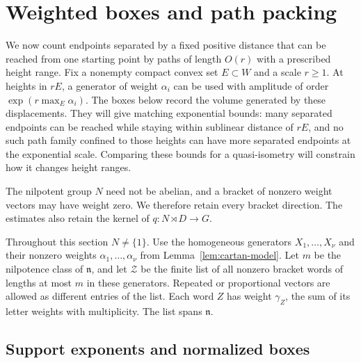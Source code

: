 \section{Weighted boxes and path packing}\label{sec:boxes}

We now count endpoints separated by a fixed positive distance that can
be reached from one starting point by paths of length $O(r)$ with a
prescribed height range. Fix a nonempty compact convex set $E\subset W$
and a scale $r\ge1$.
At heights in $rE$, a generator of weight $\alpha_i$ can
be used with amplitude of order $\exp(r\max_E\alpha_i)$. The boxes below
record the volume generated by these displacements. They will give
matching exponential bounds: many separated endpoints can be reached
while staying within sublinear distance of $rE$, and no such path family
confined to those heights can have more separated endpoints at
the exponential scale. Comparing these bounds for a quasi-isometry
will constrain how it changes height ranges.

The nilpotent group $N$ need not be abelian, and a bracket of nonzero
weight vectors may have weight zero. We therefore retain every bracket
direction. The estimates also retain the kernel of
$q:N\rtimes D\to G$.

Throughout this section $N\ne\{1\}$. Use the homogeneous generators
$X_1,\ldots,X_\nu$ and their nonzero weights $\alpha_1,\ldots,\alpha_\nu$
from Lemma~\ref{lem:cartan-model}. Let $m$ be the nilpotence class of
$\mathfrak n$, and let $\mathcal Z$ be the finite list of all nonzero
bracket words of lengths at most $m$ in these generators. Repeated or
proportional vectors are allowed as different entries of the list. Each
word $Z$ has weight $\gamma_Z$, the sum of its letter weights with
multiplicity. The list spans $\mathfrak n$.

\subsection{Support exponents and normalized boxes}

